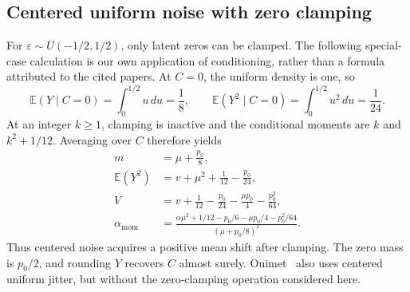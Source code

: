 \documentclass[11pt]{article}
\newcommand{\E}{\mathbb{E}}
\begin{document}
\subsection{Centered uniform noise with zero clamping}
For $\varepsilon\sim U(-1/2,1/2)$, only latent zeros can be clamped.
The following special-case calculation is our own application of
conditioning, rather than a formula attributed to the cited papers.
At $C=0$, the uniform density is one, so
\begin{equation}
  \E(Y\mid C=0)=\int_0^{1/2}u\,du=\frac18,\qquad
  \E(Y^2\mid C=0)=\int_0^{1/2}u^2\,du=\frac1{24}.
\end{equation}
At an integer $k\geq1$, clamping is inactive and the conditional moments
are $k$ and $k^2+1/12$. Averaging over $C$ therefore yields
\begin{align}
  m &= \mu+\frac{p_0}{8},\\
  \E(Y^2)&=v+\mu^2+\frac1{12}-\frac{p_0}{24},\\
  V&=v+\frac1{12}-\frac{p_0}{24}
       -\frac{\mu p_0}{4}-\frac{p_0^2}{64},\\
  \alpha_{\mathrm{mom}}
    &=\frac{\alpha\mu^2+1/12-p_0/6-\mu p_0/4-p_0^2/64}
            {(\mu+p_0/8)^2}.
\end{align}
Thus centered noise acquires a positive mean shift after clamping.
The zero mass is $p_0/2$, and rounding $Y$ recovers $C$ almost surely.
Ouimet~\cite{ouimet2023} also uses centered uniform jitter, but without
the zero-clamping operation considered here.
\end{document}
